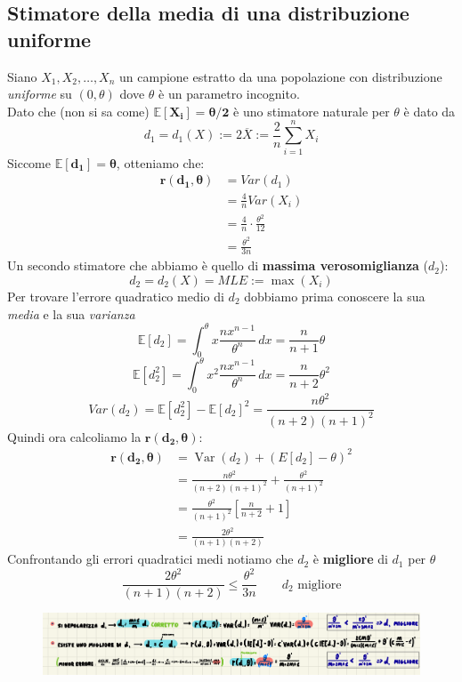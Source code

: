 \documentclass[]{article}
\newcommand{\ev}{\mathbb{E}[X]}
\renewcommand{\ev}[1]{\mathbb{E}[#1]}
\begin{document}
    \subsection{Stimatore della media di una distribuzione uniforme}
    Siano $X_1, X_2, \ldots, X_n$ un campione estratto da una popolazione con distribuzione \textit{uniforme} su $(0, \theta)$ dove $\theta$ è un parametro incognito. \\
    Dato che (non si sa come) $\boldsymbol{\ev{X_i} = \theta / 2}$ è uno stimatore naturale per $\theta$ è dato da
    \[ d_1 = d_1 (X) := 2 \overline{X} := \frac{2}{n} \displaystyle\sum_{i=1}^{n} X_i \]
    Siccome $\boldsymbol{\ev{d_1} = \theta}$, otteniamo che:
    \begin{equation*}
        \begin{split}
            \boldsymbol{r(d_1, \theta)} &= Var(d_1) \\
            &= \frac{4}{n} Var(X_i) \\
            &= \frac{4}{n} \cdot \frac{\theta^2}{12} \\
            &= \frac{\theta^2}{3n}
        \end{split}
    \end{equation*}
    Un secondo stimatore che abbiamo è quello di \textbf{massima verosomiglianza} ($d_2$):
    \[ d_2 = d_2(X) = MLE := \max(X_i) \]
    Per trovare l'errore quadratico medio di $d_2$ dobbiamo prima conoscere la sua \textit{media} e la sua \textit{varianza}
    \[ \ev{d_2} = \int_{0}^{\theta} x \frac{nx^{n-1}}{\theta^n} \, dx = \frac{n}{n + 1} \theta \]
    \[ \ev{d^2_2} = \int_{0}^{\theta} x^2 \frac{nx^{n-1}}{\theta^n} \, dx = \frac{n}{n+2} \theta^2 \]
    \[ Var(d_2) = \ev{d^2_2} - \ev{d_2}^2 = \frac{n \theta^2}{(n+2) (n+1)^2} \]
    Quindi ora calcoliamo la $\boldsymbol{r(d_2, \theta)}$:
    \begin{equation}
        \begin{aligned}
        \boldsymbol{r\left(d_2, \theta\right)} & =\operatorname{Var}\left(d_2\right)+\left(E\left[d_2\right]-\theta\right)^2 \\
        & =\frac{n \theta^2}{(n+2)(n+1)^2}+\frac{\theta^2}{(n+1)^2} \\
        & =\frac{\theta^2}{(n+1)^2}\left[\frac{n}{n+2}+1\right] \\
        & =\frac{2 \theta^2}{(n+1)(n+2)}
        \end{aligned}
    \end{equation}
    Confrontando gli errori quadratici medi notiamo che $d_2$ è \textbf{migliore} di $d_1$ per $\theta$
    \[ \frac{2 \theta^2}{(n+1)(n+2)} \leq \frac{\theta^2}{3n} \qquad \text{$d_2$ migliore} \]
    \begin{figure}[H]
        \includegraphics[width=\textwidth]{images/boh_5.png}
    \end{figure}
\end{document}
